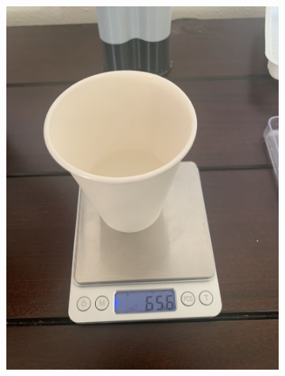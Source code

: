 \documentclass[twoside, 11pt]{article}
\begin{document}
\begin{figure}[H]
\begin{subfigure}[t]{0.165\linewidth}
		\includegraphics[width=\textwidth]{part a}
	\end{subfigure}%
	\begin{subfigure}[t]{0.165\linewidth}
		\centering

\end{subfigure}
\end{figure}
\end{document}
